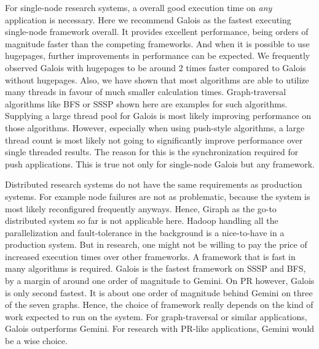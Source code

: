 For single-node research systems, a overall good execution time on \emph{any} application is necessary. 
Here we recommend Galois as the fastest executing single-node framework overall.
It provides excellent performance, being orders of magnitude faster than the competing frameworks. And when it is possible to use hugepages, further improvements in performance can be expected. We frequently observed Galois with hugepages to be around 2 times faster compared to Galois without hugepages.
Also, we have shown that most algorithms are able to utilize many threads in favour of much smaller calculation times. Graph-traversal algorithms like BFS or SSSP shown here are examples for such algorithms.
Supplying a large thread pool for Galois is most likely improving performance on those algorithms.
However, especially when using push-style algorithms, a large thread count is most likely not going to significantly improve performance over single threaded results. 
The reason for this is the synchronization required for push applications. This is true not only for single-node Galois but any framework.

Distributed research systems do not have the same requirements as production systems. For example node failures are not as problematic, because the system is most likely reconfigured frequently anyways.
Hence, Giraph as the go-to distributed system so far is not applicable here. Hadoop handling all the parallelization and fault-tolerance in the background is a nice-to-have in a production system. But in research, one might not be willing to pay the price of increased execution times over other frameworks.
A framework that is fast in many algorithms is required. 
Galois is the fastest framework on SSSP and BFS, by a margin of around one order of magnitude to Gemini. 
On PR however, Galois is only second fastest. It is about one order of magnitude behind Gemini on three of the seven graphs.
Hence, the choice of framework really depends on the kind of work expected to run on the system. For graph-traversal or similar applications, Galois outperforms Gemini. For research with PR-like applications, Gemini would be a wise choice.

